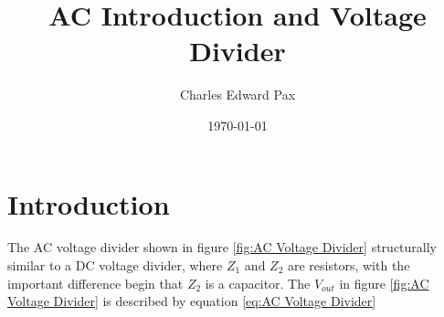 \documentclass[11pt,onecolumn]{article}
\begin{document}

\title{AC Introduction and Voltage Divider}

\date{\today}

\author{Charles Edward Pax}

\maketitle


\section{Introduction}\label{sec:Introduction}
The AC voltage divider shown in figure \ref{fig:AC Voltage Divider} structurally similar to a DC voltage divider, where $Z_1$ and $Z_2$ are resistors, with the important difference begin that $Z_2$ is a capacitor. The $V_{out}$ in figure \ref{fig:AC Voltage Divider} is described by equation \ref{eq:AC Voltage Divider}
\end{document}

